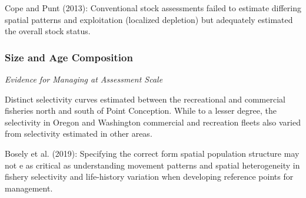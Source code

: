 \documentclass[11pt,
  english,
  a4paper,
]{article}
\begin{document}
\leavevmode\tagmcend\tagstructend\par


Cope and Punt {(2013)\leavevmode\tagmcend\tagstructend}: Conventional stock assessments failed to estimate differing spatial patterns and exploitation (localized depletion) but adequately estimated the overall stock status.

\leavevmode\tagmcend\tagstructend\par


\hypertarget{size-and-age-composition}{%
\subsubsection{Size and Age Composition}\label{size-and-age-composition}}

\leavevmode\tagmcend\tagstructend


\emph{Evidence for Managing at Assessment Scale}

\leavevmode\tagmcend\tagstructend\par


Distinct selectivity curves estimated between the recreational and commercial fisheries north and south of Point Conception. While to a lesser degree, the selectivity in Oregon and Washington commercial and recreation fleets also varied from selectivity estimated in other areas.

\leavevmode\tagmcend\tagstructend\par


Bosely et al. {(2019)\leavevmode\tagmcend\tagstructend}: Specifying the correct form spatial population structure may not e as critical as understanding movement patterns and spatial heterogeneity in fishery selectivity and life-history variation when developing reference points for management.

\leavevmode\tagmcend\tagstructend\par

\end{document}
